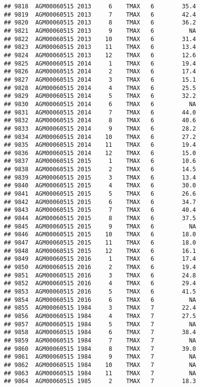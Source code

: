 \documentclass{article}\usepackage[]{graphicx}\usepackage[]{color}
\makeatletter
\newenvironment{kframe}{%
 \def\at@end@of@kframe{}%
 \ifinner\ifhmode%
  \def\at@end@of@kframe{\end{minipage}}%
  \begin{minipage}{\columnwidth}%
 \fi\fi%
 \def\FrameCommand##1{\hskip\@totalleftmargin \hskip-\fboxsep
 \colorbox{shadecolor}{##1}\hskip-\fboxsep
     \hskip-\linewidth \hskip-\@totalleftmargin \hskip\columnwidth}%
 \MakeFramed {\advance\hsize-\width
   \@totalleftmargin\z@ \linewidth\hsize
   \@setminipage}}%
 {\par\unskip\endMakeFramed%
 \at@end@of@kframe}
\newenvironment{knitrout}{}{} %
\makeatother
\begin{document}
\begin{knitrout}
\begin{kframe}
\begin{verbatim}
## 9818  AGM00060515 2013     6    TMAX   6        35.4
## 9819  AGM00060515 2013     7    TMAX   6        42.4
## 9820  AGM00060515 2013     8    TMAX   6        36.2
## 9821  AGM00060515 2013     9    TMAX   6          NA
## 9822  AGM00060515 2013    10    TMAX   6        31.4
## 9823  AGM00060515 2013    11    TMAX   6        13.4
## 9824  AGM00060515 2013    12    TMAX   6        12.6
## 9825  AGM00060515 2014     1    TMAX   6        19.4
## 9826  AGM00060515 2014     2    TMAX   6        17.4
## 9827  AGM00060515 2014     3    TMAX   6        15.1
## 9828  AGM00060515 2014     4    TMAX   6        25.5
## 9829  AGM00060515 2014     5    TMAX   6        32.2
## 9830  AGM00060515 2014     6    TMAX   6          NA
## 9831  AGM00060515 2014     7    TMAX   6        44.0
## 9832  AGM00060515 2014     8    TMAX   6        40.6
## 9833  AGM00060515 2014     9    TMAX   6        28.2
## 9834  AGM00060515 2014    10    TMAX   6        27.2
## 9835  AGM00060515 2014    11    TMAX   6        19.4
## 9836  AGM00060515 2014    12    TMAX   6        15.0
## 9837  AGM00060515 2015     1    TMAX   6        10.6
## 9838  AGM00060515 2015     2    TMAX   6        14.5
## 9839  AGM00060515 2015     3    TMAX   6        13.4
## 9840  AGM00060515 2015     4    TMAX   6        30.0
## 9841  AGM00060515 2015     5    TMAX   6        26.6
## 9842  AGM00060515 2015     6    TMAX   6        34.7
## 9843  AGM00060515 2015     7    TMAX   6        40.4
## 9844  AGM00060515 2015     8    TMAX   6        37.5
## 9845  AGM00060515 2015     9    TMAX   6          NA
## 9846  AGM00060515 2015    10    TMAX   6        18.0
## 9847  AGM00060515 2015    11    TMAX   6        18.0
## 9848  AGM00060515 2015    12    TMAX   6        16.1
## 9849  AGM00060515 2016     1    TMAX   6        17.4
## 9850  AGM00060515 2016     2    TMAX   6        19.4
## 9851  AGM00060515 2016     3    TMAX   6        24.8
## 9852  AGM00060515 2016     4    TMAX   6        29.4
## 9853  AGM00060515 2016     5    TMAX   6        41.5
## 9854  AGM00060515 2016     6    TMAX   6          NA
## 9855  AGM00060515 1984     3    TMAX   7        22.4
## 9856  AGM00060515 1984     4    TMAX   7        27.5
## 9857  AGM00060515 1984     5    TMAX   7          NA
## 9858  AGM00060515 1984     6    TMAX   7        38.4
## 9859  AGM00060515 1984     7    TMAX   7          NA
## 9860  AGM00060515 1984     8    TMAX   7        39.0
## 9861  AGM00060515 1984     9    TMAX   7          NA
## 9862  AGM00060515 1984    10    TMAX   7          NA
## 9863  AGM00060515 1984    11    TMAX   7          NA
## 9864  AGM00060515 1985     2    TMAX   7        18.3

\end{verbatim}
\end{kframe}
\end{knitrout}
\end{document}
